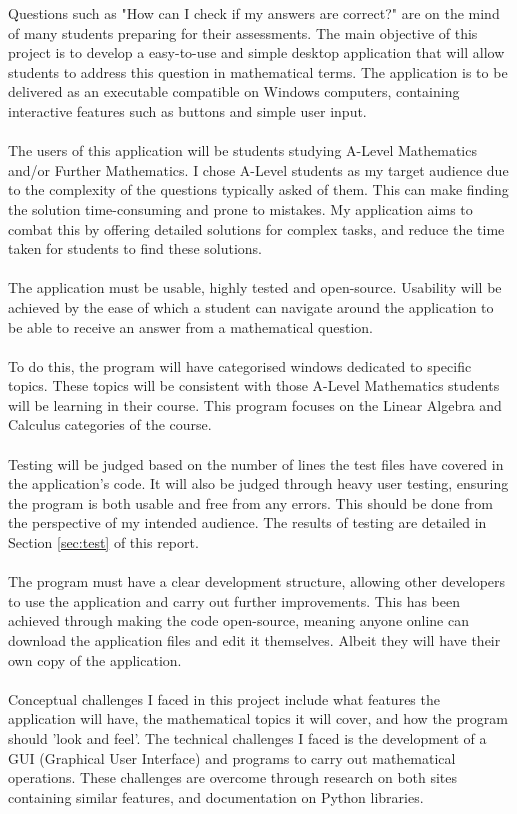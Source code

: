 \documentclass[final]{cmpreport}
\begin{document}
	Questions such as "How can I check if my answers are correct?" are on the mind of many students preparing for their assessments. The main objective of this project is to develop a easy-to-use and simple desktop application that will allow students to address this question in mathematical terms. The application is to be delivered as an executable compatible on Windows computers, containing interactive features such as buttons and simple user input.\\
	\\The users of this application will be students studying A-Level Mathematics and/or Further Mathematics. I chose A-Level students as my target audience due to the complexity of the questions typically asked of them. This can make finding the solution time-consuming and prone to mistakes.  My application aims to combat this by offering detailed solutions for complex tasks, and reduce the time taken for students to find these solutions.\\
	\\The application must be usable, highly tested and open-source. Usability will be achieved by the ease of which a student can navigate around the application to be able to receive an answer from a mathematical question.\\
	\\To do this, the program will have categorised windows dedicated to specific topics. These topics will be consistent with those A-Level Mathematics students will be learning in their course. This program focuses on the Linear Algebra and Calculus categories of the course.\\
	\\Testing will be judged based on the number of lines the test files have covered in the application's code. It will also be judged through heavy user testing, ensuring the program is both usable and free from any errors. This should be done from the perspective of my intended audience. The results of testing are detailed in Section \ref{sec:test} of this report. \\
	\\The program must have a clear development structure, allowing other developers to use the application and carry out further improvements. This has been achieved through making the code open-source, meaning anyone online can download the application files and edit it themselves. Albeit they will have their own copy of the application.\\
	\\Conceptual challenges I faced in this project include what features the application will have, the mathematical topics it will cover, and how the program should 'look and feel'. The technical challenges I faced is the development of a GUI (Graphical User Interface) and programs to carry out mathematical operations. These challenges are overcome through research on both sites containing similar features, and documentation on Python libraries. \\
\end{document}
